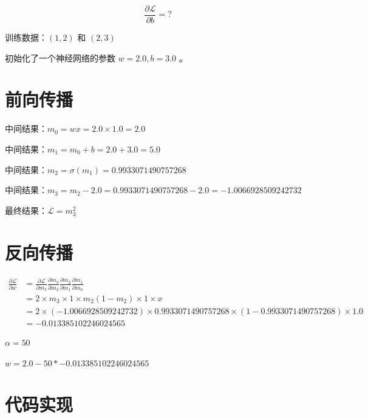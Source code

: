 \documentclass[lang=cn,newtx,10pt,scheme=chinese]{elegantbook}
\begin{document}
\begin{equation}
\frac{\partial \mathcal{L}}{\partial b} = ?
\end{equation}

训练数据：$(1,2)$ 和 $(2,3)$

初始化了一个神经网络的参数 $w=2.0, b=3.0$ 。

\section{前向传播}

中间结果：$m_{0} = wx = 2.0 \times 1.0 = 2.0$

中间结果：$m_{1} = m_{0}+b=2.0 + 3.0 = 5.0$

中间结果：$m_{2} = \sigma (m_{1}) = 0.9933071490757268$

中间结果：$m_{3} = m_{2}-2.0=0.9933071490757268-2.0=-1.0066928509242732$

最终结果：$\mathcal{L}=m_{3}^2$

\section{反向传播}

\begin{equation}
\begin{aligned}
\frac{\partial \mathcal{L}}{\partial w}
&= \frac{\partial\mathcal{L}}{\partial m_{3}}\frac{\partial m_{3}}{\partial m_{2}}\frac{\partial m_{2}}{\partial m_{1}}\frac{\partial m_{1}}{\partial m_{0}} \\
&= 2\times m_{3}\times 1 \times m_2(1-m_{2})\times 1 \times x \\
&= 2\times(-1.0066928509242732)\times 0.9933071490757268\times(1-0.9933071490757268)\times 1.0 \\
&= -0.013385102246024565
\end{aligned}
\end{equation}

$\alpha = 50$

$w = 2.0 - 50 * -0.013385102246024565$

\section{代码实现}
\end{document}

